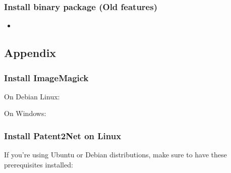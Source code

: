 \documentclass[letterpaper,10pt,english]{sphinxmanual}
\begin{document}
\subsubsection{Install binary package (Old features)}
\label{\detokenize{setup:install-binary-package-old-features}}\begin{itemize}
\item {} 

\end{itemize}


\subsection{Appendix}
\label{\detokenize{setup:appendix}}

\subsubsection{Install ImageMagick}
\label{\detokenize{setup:install-imagemagick}}
On Debian Linux:

\begin{sphinxVerbatim}[commandchars=\\\{\}]
  
\end{sphinxVerbatim}

On Windows:

\begin{sphinxVerbatim}[commandchars=\\\{\}]
\end{sphinxVerbatim}


\subsubsection{Install Patent2Net on Linux}
\label{\detokenize{setup:install-patent2net-on-linux}}
If you’re using Ubuntu or Debian distributions, make sure to have these prerequisites installed:

\begin{sphinxVerbatim}[commandchars=\\\{\}]
         
\end{sphinxVerbatim}
\end{document}

